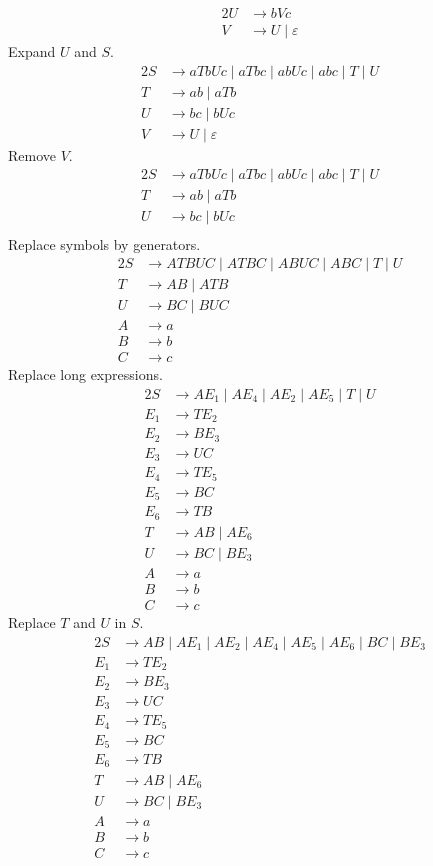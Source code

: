 \documentclass[docid=PA09]{tcom_PA}
\begin{document}
{\begin{alignat*}{2}
	U &\rightarrow bVc\\
	V &\rightarrow U\mid \varepsilon
\end{alignat*}
Expand $U$ and $S$.
\begin{alignat*}{2}
	S &\rightarrow aTbUc\mid aTbc\mid abUc\mid abc\mid T\mid U\\
	T &\rightarrow ab\mid aTb\\
	U &\rightarrow bc\mid bUc\\
	V &\rightarrow U\mid \varepsilon
\end{alignat*}
Remove $V$.
\begin{alignat*}{2}
	S &\rightarrow aTbUc\mid aTbc\mid abUc\mid abc\mid T\mid U\\
	T &\rightarrow ab\mid aTb\\
	U &\rightarrow bc\mid bUc\\
\end{alignat*}
Replace symbols by generators.
\begin{alignat*}{2}
	S &\rightarrow ATBUC\mid ATBC\mid ABUC\mid ABC\mid T\mid U\\
	T &\rightarrow AB\mid ATB\\
	U &\rightarrow BC\mid BUC\\
	A &\rightarrow a\\
	B &\rightarrow b\\
	C &\rightarrow c
\end{alignat*}
Replace long expressions.
\begin{alignat*}{2}
	S   &\rightarrow AE_1\mid AE_4\mid AE_2\mid AE_5\mid T\mid U\\
	E_1 &\rightarrow TE_2\\
	E_2 &\rightarrow BE_3\\
	E_3 &\rightarrow UC\\
	E_4 &\rightarrow TE_5\\
	E_5 &\rightarrow BC\\
	E_6 &\rightarrow TB\\
	T   &\rightarrow AB\mid AE_6\\
	U   &\rightarrow BC\mid BE_3\\
	A   &\rightarrow a\\
	B   &\rightarrow b\\
	C   &\rightarrow c
\end{alignat*}
Replace $T$ and $U$ in $S$.
\begin{alignat*}{2}
	S   &\rightarrow AB\mid AE_1\mid AE_2\mid AE_4\mid AE_5\mid AE_6\mid BC\mid BE_3\\
	E_1 &\rightarrow TE_2\\
	E_2 &\rightarrow BE_3\\
	E_3 &\rightarrow UC\\
	E_4 &\rightarrow TE_5\\
	E_5 &\rightarrow BC\\
	E_6 &\rightarrow TB\\
	T   &\rightarrow AB\mid AE_6\\
	U   &\rightarrow BC\mid BE_3\\
	A   &\rightarrow a\\
	B   &\rightarrow b\\
	C   &\rightarrow c
\end{alignat*}
}
\end{document}
